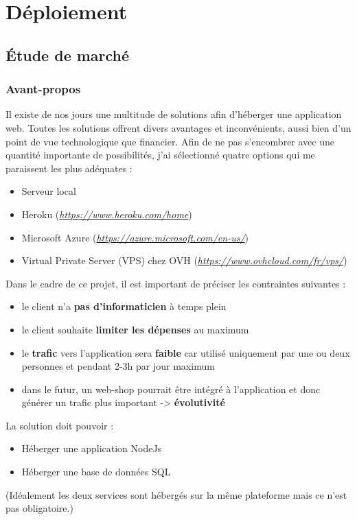 \section{Déploiement}
\subsection{Étude de marché}
\subsubsection{Avant-propos}
Il existe de nos jours une multitude de solutions afin d'héberger une application web. Toutes les solutions offrent divers avantages et inconvénients, aussi bien d'un point de vue technologique que financier. Afin de ne pas s'encombrer avec une quantité importante de possibilités, j'ai sélectionné quatre options qui me paraissent les plus adéquates :
\begin{itemize}
  \item Serveur local
  \item Heroku (\textit{\url{https://www.heroku.com/home}})
  \item Microsoft Azure (\textit{\url{https://azure.microsoft.com/en-us/}})
  \item Virtual Private Server (VPS) chez OVH (\textit{\url{https://www.ovhcloud.com/fr/vps/}})
\end{itemize}

\newpara

Dans le cadre de ce projet, il est important de préciser les contraintes suivantes :
\begin{itemize}
  \item le client n'a \textbf{pas d'informaticien} à temps plein
  \item le client souhaite \textbf{limiter les dépenses} au maximum
  \item le \textbf{trafic} vers l'application sera \textbf{faible} car utilisé uniquement par une ou deux personnes et pendant 2-3h par jour maximum
  \item dans le futur, un web-shop pourrait être intégré à l'application et donc générer un trafic plus important -> \textbf{évolutivité}
\end{itemize}

\newpara

La solution doit pouvoir :
\begin{itemize}
  \item Héberger une application NodeJs
  \item Héberger une base de données SQL
\end{itemize}
(Idéalement les deux services sont hébergés sur la même plateforme mais ce n'est pas obligatoire.)

